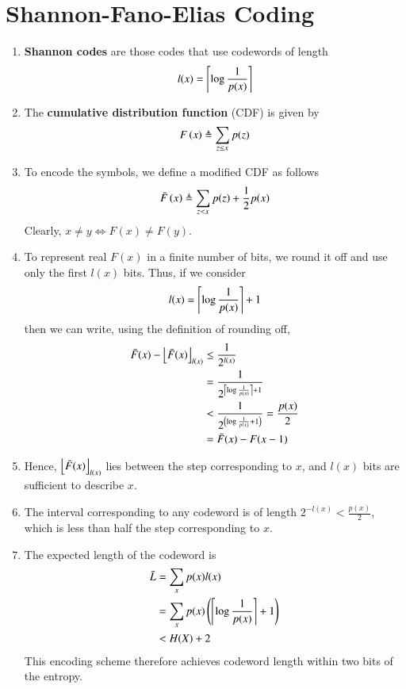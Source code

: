 \documentclass[journal,12pt,twocolumn]{IEEEtran}
\renewcommand\thesection{\arabic{section}}
\begin{document}
\section{Shannon-Fano-Elias Coding}
\begin{enumerate}[label=\thesection.\arabic*, ref=\thesection.\theenumi]
    \item \textbf{Shannon codes} are those codes that use codewords of length
    \begin{align}
        l(x) = \left\lceil{\log\frac{1}{p(x)}}\right\rceil
        \label{eq:l-p-ceil}
    \end{align}
    \item The \textbf{cumulative distribution function} (CDF) is given by
    \begin{align}
        F\left(x\right) \triangleq \sum_{z\le x}p(z)
        \label{eq:cdf-def}
    \end{align}
    \item To encode the symbols, we define a modified CDF as follows
    \begin{align}
        \bar{F}\left(x\right) \triangleq \sum_{z<x}p(z) + \frac{1}{2}p(x)
        \label{eq:cdf-mod}
    \end{align}
    Clearly, $x \neq y \iff F(x) \neq F(y)$.
    \item To represent real $F(x)$ in a finite number of bits, we round it off
    and use only the first $l(x)$ bits. Thus, if we consider 
    \begin{align}
        l(x) = \left\lceil{\log\frac{1}{p(x)}}\right\rceil + 1
        \label{eq:l-x-choose}
    \end{align}
    then we can write, using the definition of rounding off,
    \begin{align}
        \bar{F}(x) - \left\lfloor{\bar{F}(x)}\right\rfloor_{l(x)} &\le \frac{1}{2^{l\left(x\right)}} \\
        &= \frac{1}{2^{\left\lceil{\log\frac{1}{p(x)}}\right\rceil+1}} \\
        &< \frac{1}{2^{\left(\log\frac{1}{p(x)}+1\right)}} = \frac{p(x)}{2} \\
        &= \bar{F}(x) - F(x-1)
        \label{eq:int-fbar}
    \end{align}
    \item Hence, $\left\lfloor{\bar{F}(x)}\right\rfloor_{l(x)}$ lies between the step corresponding 
    to $x$, and $l(x)$ bits are sufficient to describe $x$.
    \item The interval corresponding to any codeword is of length $2^{-l(x)} < \frac{p(x)}{2}$,
    which is less than half the step corresponding to $x$.
    \item The expected length of the codeword is
    \begin{align}
        \bar{L} &= \sum_{x}p(x)l(x) \\
        &= \sum_{x}p(x)\left(\left\lceil{\log\frac{1}{p(x)}}\right\rceil+1\right) \\
        &< H(X) + 2
        \label{eq:shan-bound}
    \end{align}
    This encoding scheme therefore achieves codeword length within two bits of
    the entropy.
\end{enumerate}
\end{document}
